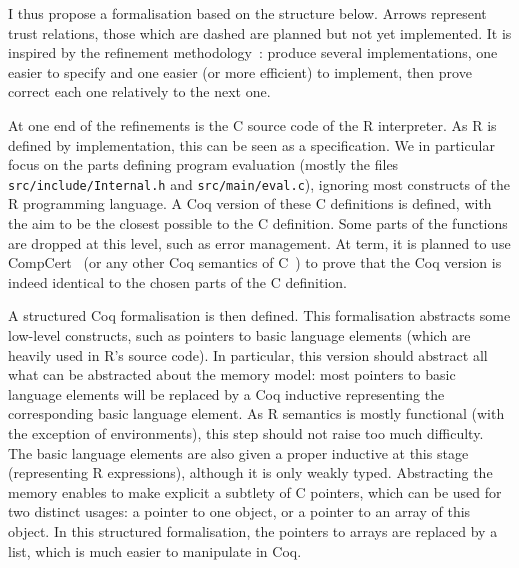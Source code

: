 \documentclass{article}
\newcommand\Coq{Coq}
\newcommand\R{R}
\newcommand\Cn{C}
\begin{document}
I thus propose a formalisation based on the structure below.
Arrows represent trust relations,
those which are dashed are planned but not yet implemented.
It is inspired by the refinement methodology~\parencite{cohen2013refinements}:
produce several implementations,
one easier to specify and one easier (or more efficient) to implement,
then prove correct each one relatively to the next one.
\begin{center}
\end{center}
At one end of the refinements is the \Cn{} source code of the \R{} interpreter.
As \R{} is defined by implementation,
this can be seen as a specification.
We in particular focus on the parts defining program evaluation
(mostly the files \texttt{src/include/Internal.h} and \texttt{src/main/eval.c}),
ignoring most constructs of the \R{} programming language.
A \Coq{} version of these \Cn{} definitions is defined,
with the aim to be the closest possible to the \Cn{} definition.
Some parts of the functions are dropped at this level,
such as error management.
At term, it is planned to use CompCert~\parencite{Leroy-Compcert-CACM}
(or any other \Coq{} semantics of \Cn{}~\parencite{formalin})
to prove that the \Coq{}
version is indeed identical to the chosen parts of the \Cn{} definition.

A structured \Coq{} formalisation is then defined.
This formalisation abstracts some low-level constructs,
such as pointers to basic language elements
(which are heavily used in \R{}'s source code).
In particular, this version should abstract all what can be abstracted
about the memory model:
most pointers to basic language elements
will be replaced by a \Coq{} inductive representing
the corresponding basic language element.
As \R{} semantics is mostly functional
(with the exception of environments),
this step should not raise too much difficulty.
The basic language elements are also given a proper
inductive at this stage (representing \R{} expressions),
although it is only weakly typed.
Abstracting the memory enables to make explicit
a subtlety of \Cn{} pointers,
which can be used for two distinct usages:
a pointer to one object,
or a pointer to an array of this object.
In this structured formalisation, the pointers to arrays
are replaced by a list,
which is much easier to manipulate in \Coq{}.
\end{document}
